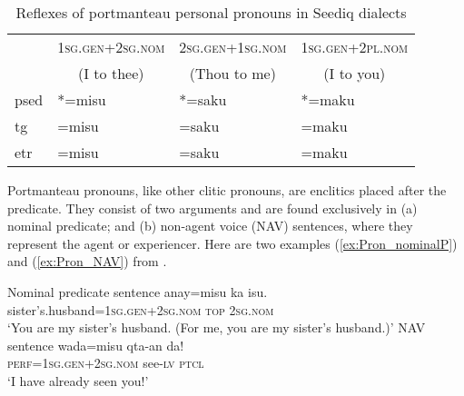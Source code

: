 \begin{table}[!htbp]
\centering
\caption{Reflexes of portmanteau personal pronouns in Seediq dialects}
\label{tab:porref}
\begin{tabular}{llll}
\hline
                     & \textsc{1sg.gen+2sg.nom}                 & \textsc{2sg.gen+1sg.nom}                  & \textsc{1sg.gen+2pl.nom}                \\ 
\multicolumn{1}{c}{} & \multicolumn{1}{c}{(I to thee)} & \multicolumn{1}{c}{(Thou to me)} & \multicolumn{1}{c}{(I to you)} \\ \hline
\acl{psed}               & *=misu                          & *=saku                           & *=maku                         \\
\acs{tg}                 & =misu                           & =saku                            & =maku                          \\
\acs{etr}                & =misu                           & =saku                            & =maku          \\ \hline                
\end{tabular}
\end{table}

Portmanteau pronouns, like other clitic pronouns, are enclitics placed after the predicate. They consist of two arguments and are found exclusively in (a) nominal predicate; and (b) non-agent voice (NAV) sentences, where they represent the agent or experiencer. Here are two examples (\ref{ex:Pron_nominalP}) and (\ref{ex:Pron_NAV}) from \textcite[74--75]{Lee2018Trugrammar}.

\begin{exe}

    \ex Nominal predicate sentence \label{ex:Pron_nominalP}
    \gll anay=misu ka isu. \\
    sister's.husband=\textsc{1sg.gen+2sg.nom} \textsc{top} \textsc{2sg.nom}\\
    \glt `You are my sister's husband. (For me, you are my sister's husband.)'
    \ex NAV sentence \label{ex:Pron_NAV}
    \gll wada=misu qta-an da! \\
    \textsc{perf}=\textsc{1sg.gen+2sg.nom} see-\textsc{lv} \textsc{ptcl}\\
    \glt `I have already seen you!'
\end{exe}


